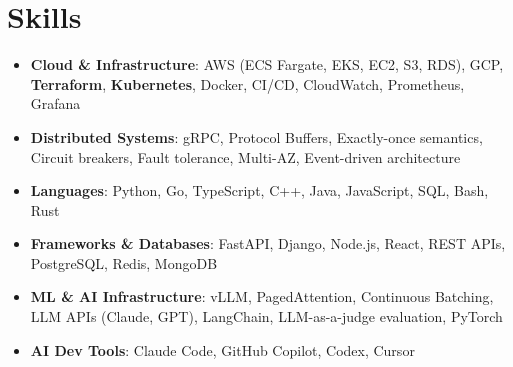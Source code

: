 \documentclass[letterpaper,11pt]{article}
\newcommand{\resumeSubHeadingListStart}{\begin{itemize}[leftmargin=0.15in, label={}]}
\newcommand{\resumeSubHeadingListEnd}{\end{itemize}}
\newcommand{\resumeSkillHeading}[2]{%
  \item\small{\textbf{#1}: #2 \vspace{-9pt}}%
}
\begin{document}
\section{Skills}
  \resumeSubHeadingListStart
    \resumeSkillHeading{Cloud \& Infrastructure}{AWS (ECS Fargate, EKS, EC2, S3, RDS), GCP, \textbf{Terraform}, \textbf{Kubernetes}, Docker, CI/CD, CloudWatch, Prometheus, Grafana}
    \resumeSkillHeading{Distributed Systems}{gRPC, Protocol Buffers, Exactly-once semantics, Circuit breakers, Fault tolerance, Multi-AZ, Event-driven architecture}
    \resumeSkillHeading{Languages}{Python, Go, TypeScript, C++, Java, JavaScript, SQL, Bash, Rust}
    \resumeSkillHeading{Frameworks \& Databases}{FastAPI, Django, Node.js, React, REST APIs, PostgreSQL, Redis, MongoDB}
    \resumeSkillHeading{ML \& AI Infrastructure}{vLLM, PagedAttention, Continuous Batching, LLM APIs (Claude, GPT), LangChain, LLM-as-a-judge evaluation, PyTorch}
    \resumeSkillHeading{AI Dev Tools}{Claude Code, GitHub Copilot, Codex, Cursor}
  \resumeSubHeadingListEnd
\end{document}
